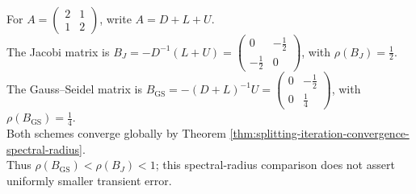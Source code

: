 \begin{example} \label{ex:two-by-two-jacobi-gauss-seidel-convergence} \\
For $A=\left(\begin{smallmatrix}2&1\\1&2\end{smallmatrix}\right)$, write $A=D+L+U$.\\
The Jacobi matrix is $B_J=-D^{-1}(L+U)=\left(\begin{smallmatrix}0&-\frac{1}{2}\\-\frac{1}{2}&0\end{smallmatrix}\right)$, with $\rho(B_J)=\frac{1}{2}$.\\
The Gauss--Seidel matrix is $B_{\operatorname{GS}}=-(D+L)^{-1}U=\left(\begin{smallmatrix}0&-\frac{1}{2}\\0&\frac{1}{4}\end{smallmatrix}\right)$, with $\rho(B_{\operatorname{GS}})=\frac{1}{4}$.\\
Both schemes converge globally by Theorem \ref{thm:splitting-iteration-convergence-spectral-radius}.\\
Thus $\rho(B_{\operatorname{GS}})<\rho(B_J)<1$; this spectral-radius comparison does not assert uniformly smaller transient error.
\end{example}

